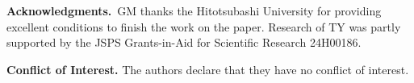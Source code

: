 \documentclass[11pt]{amsart}
\numberwithin{equation}{section}
\begin{document}

\vspace{0.5cm}
\noindent
{\bf Acknowledgments.}\ 
GM thanks the Hitotsubashi University for providing excellent conditions to finish the work on the paper.
Research of  TY  was partly supported by the JSPS Grants-in-Aid for Scientific Research  24H00186.


\vspace{0.5cm}
\noindent
\textbf{Conflict of Interest.}
The authors declare that they have no conflict of interest.





	
	
	
	
	
\end{document}
